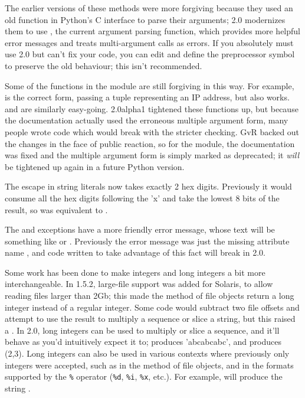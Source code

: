 \documentclass{howto}
\begin{document}
The earlier versions of these methods were more forgiving because they
used an old function in Python's C interface to parse their arguments;
2.0 modernizes them to use , the current
argument parsing function, which provides more helpful error messages
and treats multi-argument calls as errors.  If you absolutely must use
2.0 but can't fix your code, you can edit 
and define the preprocessor symbol  to
preserve the old behaviour; this isn't recommended.

Some of the functions in the  module are still
forgiving in this way.  For example,  is the correct form, passing a tuple representing
an IP address, but  also
works.  and  are
similarly easy-going.  2.0alpha1 tightened these functions up, but
because the documentation actually used the erroneous multiple
argument form, many people wrote code which would break with the
stricter checking.  GvR backed out the changes in the face of public
reaction, so for the  module, the documentation was
fixed and the multiple argument form is simply marked as deprecated;
it \emph{will} be tightened up again in a future Python version.

The  escape in string literals now takes exactly 2 hex
digits.  Previously it would consume all the hex digits following the
'x' and take the lowest 8 bits of the result, so  was
equivalent to .

The  and  exceptions
have a more friendly error message, whose text will be something like
 or .  Previously the error message was just the missing
attribute name , and code written to take advantage of this
fact will break in 2.0.

Some work has been done to make integers and long integers a bit more
interchangeable.  In 1.5.2, large-file support was added for Solaris,
to allow reading files larger than 2Gb; this made the 
method of file objects return a long integer instead of a regular
integer.  Some code would subtract two file offsets and attempt to use
the result to multiply a sequence or slice a string, but this raised a
.  In 2.0, long integers can be used to multiply
or slice a sequence, and it'll behave as you'd intuitively expect it
to;  produces 'abcabcabc', and  produces (2,3). Long integers can also be used in
various contexts where previously only integers were accepted, such
as in the  method of file objects, and in the formats
supported by the \verb|%| operator (\verb|%d|, \verb|%i|, \verb|%x|,
etc.).  For example,  will produce the string
.
\end{document}
